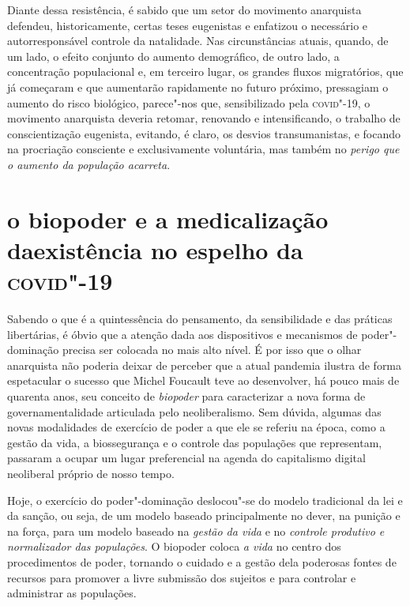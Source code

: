 Diante dessa resistência, é sabido que um setor do movimento anarquista
defendeu, historicamente, certas teses eugenistas e enfatizou o
necessário e autorresponsável controle da natalidade. Nas circunstâncias
atuais, quando, de um lado, o efeito conjunto do aumento demográfico, de
outro lado, a concentração populacional e, em terceiro lugar, os grandes
fluxos migratórios, que já começaram e que aumentarão rapidamente no
futuro próximo, pressagiam o aumento do risco biológico, parece"-nos que,
sensibilizado pela \textsc{covid}"-19, o movimento anarquista deveria retomar,
renovando e intensificando, o trabalho de conscientização eugenista,
evitando, é claro, os desvios transumanistas, e focando na procriação
consciente e exclusivamente voluntária, mas também no \textit{perigo que
o aumento da população acarreta}.


\section{o biopoder e a medicalização da\break existência no espelho da \textsc{covid}"-19}

Sabendo o que é a quintessência do pensamento, da sensibilidade e das
práticas libertárias, é óbvio que a atenção dada aos dispositivos e
mecanismos de poder"-dominação precisa ser colocada no mais alto nível. É
por isso que o olhar anarquista não poderia deixar de perceber que a
atual pandemia ilustra de forma espetacular o sucesso que Michel
Foucault teve ao desenvolver, há pouco mais de quarenta anos, seu
conceito de \textit{biopoder} para caracterizar a nova forma de
governamentalidade articulada pelo neoliberalismo. Sem dúvida, algumas
das novas modalidades de exercício de poder a que ele se referiu na
época, como a gestão da vida, a biossegurança e o controle das
populações que representam, passaram a ocupar um lugar preferencial na
agenda do capitalismo digital neoliberal próprio de nosso tempo.

Hoje, o exercício do poder"-dominação deslocou"-se do modelo tradicional
da lei e da sanção, ou seja, de um modelo baseado principalmente no
dever, na punição e na força, para um modelo baseado na \textit{gestão
da vida} e no \textit{controle produtivo e normalizador das populações}.
O biopoder coloca \textit{a vida} no centro dos procedimentos de poder,
tornando o cuidado e a gestão dela poderosas fontes de recursos para
promover a livre submissão dos sujeitos e para controlar e administrar
as populações.

